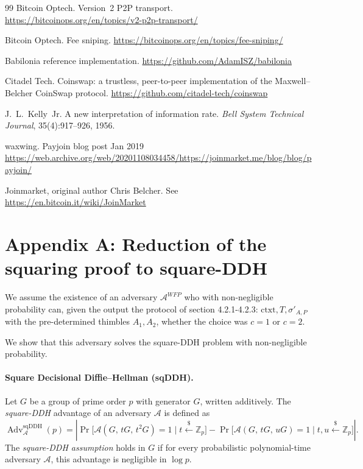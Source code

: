 \documentclass[11pt]{article}
\begin{document}
\begin{thebibliography}{99}
 Bitcoin Optech. Version~2 P2P transport. \url{https://bitcoinops.org/en/topics/v2-p2p-transport/}

 Bitcoin Optech. Fee sniping. \url{https://bitcoinops.org/en/topics/fee-sniping/}

 Babilonia reference implementation. \url{https://github.com/AdamISZ/babilonia}

 Citadel Tech. Coinswap: a trustless, peer-to-peer implementation of the Maxwell--Belcher CoinSwap protocol. \url{https://github.com/citadel-tech/coinswap}

 J.~L.~Kelly~Jr. A new interpretation of information rate. \emph{Bell System Technical Journal}, 35(4):917--926, 1956.

 waxwing. Payjoin blog post Jan 2019 \url{https://web.archive.org/web/20201108034458/https://joinmarket.me/blog/blog/payjoin/}

 Joinmarket, original author Chris Belcher. See \url{https://en.bitcoin.it/wiki/JoinMarket}

\end{thebibliography}

\newpage

\section{Appendix A: Reduction of the squaring proof to square-DDH}

We assume the existence of an adversary $\mathcal{A}^{WFP}$ who with non-negligible probability can, given the output the protocol of section 4.2.1-4.2.3: $\textrm{ctxt}, T, \sigma'_{A, P}$ with the pre-determined thimbles $A_1, A_2$, whether the choice was $c=1$ or $c=2$.

We show that this adversary solves the square-DDH problem with non-negligible probability.

\paragraph{Square Decisional Diffie--Hellman (sqDDH).}
Let $G$ be a group of prime order $p$ with generator $G$, written
additively. The \emph{square-DDH} advantage of an adversary $\mathcal{A}$
is defined as
$$
\operatorname{Adv}^{\mathrm{sqDDH}}_{\mathcal{A}}(p)
=
\left|
\Pr\!\big[\mathcal{A}(G,\, tG,\, t^{2}G)=1 \;\big|\; t \xleftarrow{\$} \mathbb{Z}_{p}\big]
-
\Pr\!\big[\mathcal{A}(G,\, tG,\, uG)=1 \;\big|\; t,u \xleftarrow{\$} \mathbb{Z}_{p}\big]
\right|.
$$
The \emph{square-DDH assumption} holds in $G$ if for every probabilistic
polynomial-time adversary $\mathcal{A}$, this advantage is negligible in
$\log p$.
\end{document}
